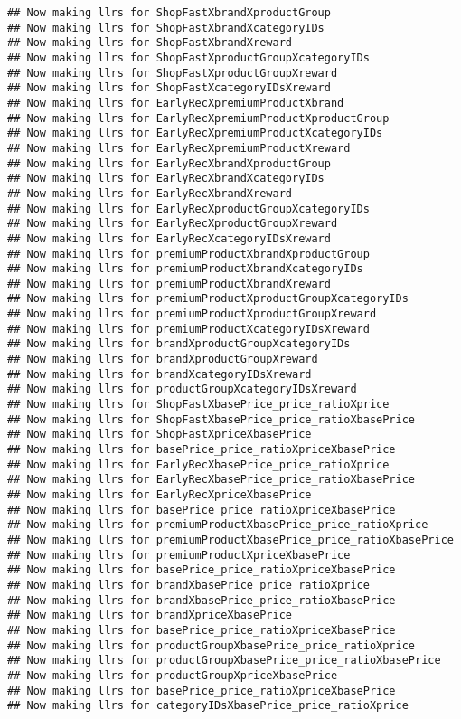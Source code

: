 \documentclass[10pt]{report}
\begin{document}
\begin{verbatim}
## Now making llrs for ShopFastXbrandXproductGroup
## Now making llrs for ShopFastXbrandXcategoryIDs
## Now making llrs for ShopFastXbrandXreward
## Now making llrs for ShopFastXproductGroupXcategoryIDs
## Now making llrs for ShopFastXproductGroupXreward
## Now making llrs for ShopFastXcategoryIDsXreward
## Now making llrs for EarlyRecXpremiumProductXbrand
## Now making llrs for EarlyRecXpremiumProductXproductGroup
## Now making llrs for EarlyRecXpremiumProductXcategoryIDs
## Now making llrs for EarlyRecXpremiumProductXreward
## Now making llrs for EarlyRecXbrandXproductGroup
## Now making llrs for EarlyRecXbrandXcategoryIDs
## Now making llrs for EarlyRecXbrandXreward
## Now making llrs for EarlyRecXproductGroupXcategoryIDs
## Now making llrs for EarlyRecXproductGroupXreward
## Now making llrs for EarlyRecXcategoryIDsXreward
## Now making llrs for premiumProductXbrandXproductGroup
## Now making llrs for premiumProductXbrandXcategoryIDs
## Now making llrs for premiumProductXbrandXreward
## Now making llrs for premiumProductXproductGroupXcategoryIDs
## Now making llrs for premiumProductXproductGroupXreward
## Now making llrs for premiumProductXcategoryIDsXreward
## Now making llrs for brandXproductGroupXcategoryIDs
## Now making llrs for brandXproductGroupXreward
## Now making llrs for brandXcategoryIDsXreward
## Now making llrs for productGroupXcategoryIDsXreward
## Now making llrs for ShopFastXbasePrice_price_ratioXprice
## Now making llrs for ShopFastXbasePrice_price_ratioXbasePrice
## Now making llrs for ShopFastXpriceXbasePrice
## Now making llrs for basePrice_price_ratioXpriceXbasePrice
## Now making llrs for EarlyRecXbasePrice_price_ratioXprice
## Now making llrs for EarlyRecXbasePrice_price_ratioXbasePrice
## Now making llrs for EarlyRecXpriceXbasePrice
## Now making llrs for basePrice_price_ratioXpriceXbasePrice
## Now making llrs for premiumProductXbasePrice_price_ratioXprice
## Now making llrs for premiumProductXbasePrice_price_ratioXbasePrice
## Now making llrs for premiumProductXpriceXbasePrice
## Now making llrs for basePrice_price_ratioXpriceXbasePrice
## Now making llrs for brandXbasePrice_price_ratioXprice
## Now making llrs for brandXbasePrice_price_ratioXbasePrice
## Now making llrs for brandXpriceXbasePrice
## Now making llrs for basePrice_price_ratioXpriceXbasePrice
## Now making llrs for productGroupXbasePrice_price_ratioXprice
## Now making llrs for productGroupXbasePrice_price_ratioXbasePrice
## Now making llrs for productGroupXpriceXbasePrice
## Now making llrs for basePrice_price_ratioXpriceXbasePrice
## Now making llrs for categoryIDsXbasePrice_price_ratioXprice

\end{verbatim}
\end{document}
